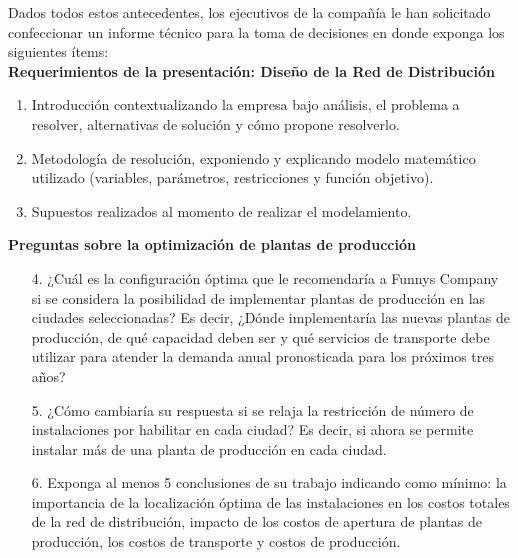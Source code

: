 \documentclass[a4paper]{article}
\begin{document}
        Dados todos estos antecedentes, los ejecutivos de la compañía le han solicitado confeccionar un informe técnico para la toma de decisiones en donde exponga los siguientes ítems:\\

        \textbf{Requerimientos de la presentación: Diseño de la Red de Distribución}
        \begin{enumerate}
            \item Introducción contextualizando la empresa bajo análisis, el problema a resolver, alternativas de solución y cómo propone resolverlo.
            \item Metodología de resolución, exponiendo y explicando modelo matemático utilizado (variables, parámetros, restricciones y función objetivo).
            \item Supuestos realizados al momento de realizar el modelamiento.\\
        \end{enumerate}

        \textbf{Preguntas sobre la optimización de plantas de producción}
    
        \begin{enumerate}
            \item[4.] ¿Cuál es la configuración óptima que le recomendaría a Funnys Company si se considera la posibilidad de implementar plantas de producción en las ciudades seleccionadas? Es decir, ¿Dónde implementaría las nuevas plantas de producción, de qué capacidad deben ser y qué servicios de transporte debe utilizar para atender la demanda anual pronosticada para los próximos tres años?
            \item[5.] ¿Cómo cambiaría su respuesta si se relaja la restricción de número de instalaciones por habilitar en cada ciudad? Es decir, si ahora se permite instalar más de una planta de producción en cada ciudad.
            \item[6.] Exponga al menos 5 conclusiones de su trabajo indicando como mínimo: la importancia de la localización óptima de las instalaciones en los costos totales de la red de distribución, impacto de los costos de apertura de plantas de producción, los costos de transporte y costos de producción.\\
        \end{enumerate}
        
\end{document}
